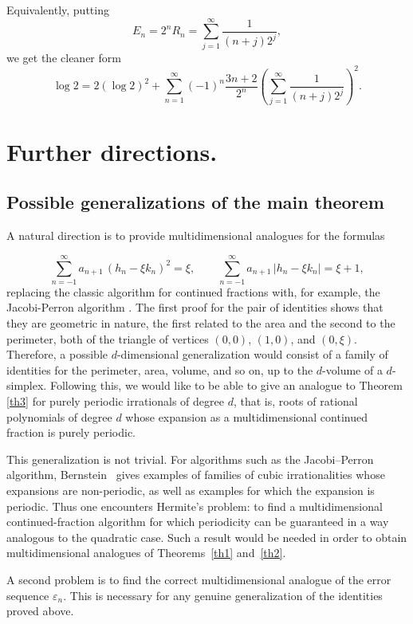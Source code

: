 \documentclass[]{interact}
\theoremstyle{plain}
\numberwithin{equation}{section} %
\numberwithin{table}{section} %
\numberwithin{figure}{section}
\begin{document}
Equivalently, putting
\[
E_n=2^nR_n
=
\sum_{j=1}^{\infty}\frac{1}{(n+j)2^j},
\]
we get the cleaner form
\[
\log2
=
2(\log2)^2
+
\sum_{n=1}^{\infty}
(-1)^n\frac{3n+2}{2^n}
\left(
\sum_{j=1}^{\infty}\frac{1}{(n+j)2^j}
\right)^2.
\]

\section{Further directions.} 


\subsection{Possible generalizations of the main theorem}

A natural direction is to provide multidimensional analogues for the formulas

\[
  \sum_{n=-1}^{\infty} a_{n+1}\,(h_n - \xi k_n)^2 = \xi,
  \qquad
  \sum_{n=-1}^{\infty} a_{n+1}\,|h_n - \xi k_n| = \xi + 1,
\]
replacing the classic algorithm for continued fractions with, for example, the Jacobi-Perron algorithm  \cite{hawkins2008continued, abramowitz1965handbook}.  The first proof for the pair of identities \cite{kalinin2019tropical} shows that they are geometric in nature, the first related to the area and the second to the perimeter, both of the triangle of vertices $(0,0)$, $(1,0)$, and $(0,\xi)$.  Therefore, a possible $d$-dimensional generalization would consist of a family of identities for the perimeter, area, volume, and so on, up to the $d$-volume of a $d$-simplex.  Following this, we would like to be able to give an analogue to Theorem \ref{th3}  for purely periodic irrationals of degree $d$, that is, roots of rational polynomials of degree $d$ whose expansion as a multidimensional continued fraction is purely periodic. 

This generalization is not trivial. For algorithms such as the Jacobi--Perron
algorithm, Bernstein~\cite{bernstein1964periodical,bernstein1966new} gives
examples of families of cubic irrationalities whose expansions are non-periodic,
as well as examples for which the expansion is periodic. Thus one encounters
Hermite's problem: to find a multidimensional continued-fraction algorithm for
which periodicity can be guaranteed in a way analogous to the quadratic case.
Such a result would be needed in order to obtain multidimensional analogues of
Theorems~\ref{th1} and~\ref{th2}.

A second problem is to find the correct multidimensional analogue of the error
sequence \(\varepsilon_n\). This is necessary for any genuine generalization of
the identities proved above.
\end{document}
